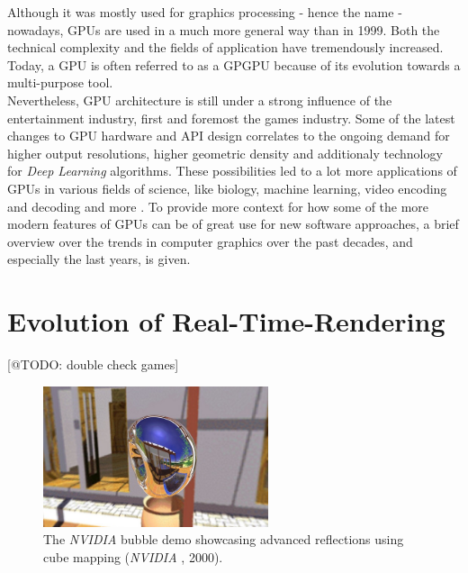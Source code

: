 \noindent
Although it was mostly used for graphics processing - hence the name - nowadays, \ac{GPU}s are used 
in a much more general way than in 1999. Both the technical complexity and the fields of application 
have tremendously increased. Today, a \ac{GPU} is often referred to as a \ac{GPGPU} because of its 
evolution towards a multi-purpose tool. \\

\noindent
Nevertheless, \ac{GPU} architecture is still under a strong influence of the entertainment 
industry, first and foremost the games industry. Some of the latest changes to \ac{GPU} 
hardware and \ac{API} design correlates to the ongoing demand for higher output resolutions, 
higher geometric density and additionaly technology for \emph{Deep Learning} algorithms. 
These possibilities led to a lot more applications of \ac{GPU}s in various fields of science, 
like biology, machine learning, video encoding and decoding and more \cite{Battaglia2024}.
To provide more context for how some of the more modern features of \ac{GPU}s can be of great 
use for new software approaches, a brief overview over the trends in computer graphics over 
the past decades, and especially the last years, is given.


\section{Evolution of Real-Time-Rendering} \label{sec-evolution-of-real-time-rendering}
[@TODO: double check games]

\begin{figure}[h]
    \centering
    \includegraphics[width=250px]{images/graphics/bubble-reflection-effects-demo.jpg}
    \caption{The \emph{NVIDIA} bubble demo showcasing advanced reflections using cube mapping (\emph{NVIDIA} \cite{NVIDIABubble}, 2000).}
    \label{fig:bubble-reflection-demo}
\end{figure}

